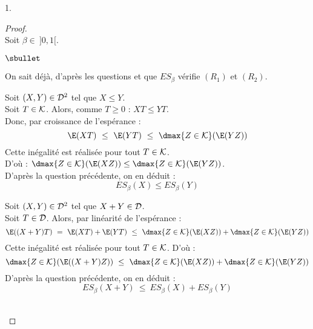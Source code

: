 \documentclass[11pt]{article}%
\begin{document}
\begin{noliste}{1.}
  \begin{proof}~\\
    Soit $\beta \in \ ]0,1[$.
    \begin{noliste}{$\sbullet$}
      \item On sait déjà, d'après les questions  et 
       que $ES_\beta$ vérifie $(R_1)$ et $(R_2)$.
      
      \item Soit $(X,Y) \in {\cal D}^2$ tel que $X \leq Y$.\\
      Soit $T \in {\cal K}$. Alors, comme $T\geq 0$ : $XT \leq YT$.\\
      Donc, par croissance de l'espérance :
      \[
        \E(XT) \ \leq \ \E(YT) \ \leq \ \dmax{Z\in {\cal K}}
        (\E(YZ))
      \]
      Cette inégalité est réalisée pour tout $T\in {\cal K}$.\\
      D'où : $\dmax{Z\in {\cal K}}(\E(XZ)) \leq \dmax{Z\in {\cal K}}
      (\E(YZ))$.\\
      D'après la question précédente, on en déduit :
      \[
        ES_\beta(X) \leq ES_\beta(Y)
      \]
      
      \item Soit $(X,Y) \in {\cal D}^2$ tel que $X +Y\in {\cal D}$.\\
      Soit $T \in {\cal D}$. Alors, par linéarité de l'espérance :
      \[
        \E((X+Y)T) \ = \ \E(XT) + \E(YT) \ \leq \ \dmax{Z\in {\cal K}}
        (\E(XZ)) + \dmax{Z\in {\cal K}} (\E(YZ))
      \]
      Cette inégalité est réalisée pour tout $T\in {\cal K}$.
      D'où : 
      \[
	\dmax{Z\in {\cal K}}(\E((X+Y)Z)) \ 
	\leq \ \dmax{Z\in {\cal K}}(\E(XZ)) +
        \dmax{Z\in {\cal K}}(\E(YZ))
      \]
      D'après la question précédente, on en déduit :
      \[
        ES_\beta(X+Y) \ \leq \ ES_\beta(X) + ES_\beta(Y)
      \]
    \end{noliste}
    ~\\[-1cm]
  \end{proof}
\end{noliste}
\end{document}

